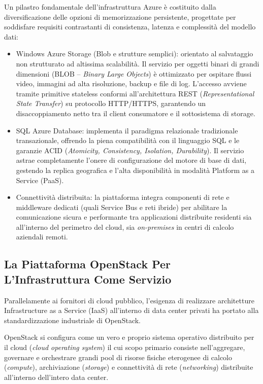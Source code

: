\documentclass[11pt, a4paper]{article}
\begin{document}
Un pilastro fondamentale dell'infrastruttura Azure è costituito dalla diversificazione delle opzioni di memorizzazione persistente, progettate per soddisfare requisiti contrastanti di consistenza, latenza e complessità del modello dati:
\begin{itemize}[noitemsep]
    \item Windows Azure Storage (Blob e strutture semplici): orientato al salvataggio non strutturato ad altissima scalabilità. Il servizio per oggetti binari di grandi dimensioni (BLOB -- \emph{Binary Large Objects}) è ottimizzato per ospitare flussi video, immagini ad alta risoluzione, backup e file di log. L'accesso avviene tramite primitive stateless conformi all'architettura REST (\emph{Representational State Transfer}) su protocollo HTTP/HTTPS, garantendo un disaccoppiamento netto tra il client consumatore e il sottosistema di storage.
    \item SQL Azure Database: implementa il paradigma relazionale tradizionale transazionale, offrendo la piena compatibilità con il linguaggio SQL e le garanzie ACID (\emph{Atomicity, Consistency, Isolation, Durability}). Il servizio astrae completamente l'onere di configurazione del motore di base di dati, gestendo la replica geografica e l'alta disponibilità in modalità Platform as a Service (PaaS).
    \item Connettività distribuita: la piattaforma integra componenti di rete e middleware dedicati (quali Service Bus e reti ibride) per abilitare la comunicazione sicura e performante tra applicazioni distribuite residenti sia all'interno del perimetro del cloud, sia \emph{on-premises} in centri di calcolo aziendali remoti.
\end{itemize}

\subsection{La Piattaforma OpenStack Per L'Infrastruttura Come Servizio}

Parallelamente ai fornitori di cloud pubblico, l'esigenza di realizzare architetture Infrastructure as a Service (IaaS) all'interno di data center privati ha portato alla standardizzazione industriale di OpenStack.

OpenStack si configura come un vero e proprio sistema operativo distribuito per il cloud (\emph{cloud operating system}) il cui scopo primario consiste nell'aggregare, governare e orchestrare grandi pool di risorse fisiche eterogenee di calcolo (\emph{compute}), archiviazione (\emph{storage}) e connettività di rete (\emph{networking}) distribuite all'interno dell'intero data center.
\end{document}
